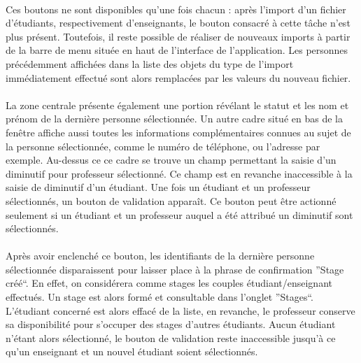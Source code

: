 \documentclass[a4paper,10pt]{report}
\begin{document}
	    \paragraph{}  
	      Ces boutons ne sont disponibles qu'une fois chacun : après l'import d'un fichier d'étudiants, respectivement d'enseignants, le bouton consacré à cette tâche n'est plus présent.
	      Toutefois, il reste possible de réaliser de nouveaux imports à partir de la barre de menu située en haut de l'interface de l'application.
	      Les personnes précédemment affichées dans la liste des objets du type de l'import immédiatement effectué sont alors remplacées par les valeurs du nouveau fichier.  
	      
	    \paragraph{}      
	      La zone centrale présente également une portion révélant le statut et les nom et prénom de la dernière personne sélectionnée.
	      Un autre cadre situé en bas de la fenêtre affiche aussi toutes les informations complémentaires connues au sujet de la personne sélectionnée, comme le numéro de téléphone, ou l'adresse par exemple.
	      Au-dessus ce ce cadre se trouve un champ permettant la saisie d'un diminutif pour professeur sélectionné.
	      Ce champ est en revanche inaccessible à la saisie de diminutif d'un étudiant.      
	      Une fois un étudiant et un professeur sélectionnés, un bouton de validation apparaît.
	      Ce bouton peut être actionné seulement si un étudiant et un professeur auquel a été attribué un diminutif sont sélectionnés.
	    
	    \paragraph{}
	      Après avoir enclenché ce bouton, les identifiants de la dernière personne sélectionnée disparaissent pour laisser place à la phrase de confirmation ''Stage créé``.
	      En effet, on considérera comme stages les couples étudiant/enseignant effectués.
	      Un stage est alors formé et consultable dans l'onglet ''Stages``. 
	      L'étudiant concerné est alors effacé de la liste, en revanche, le professeur conserve sa disponibilité pour s'occuper des stages d'autres étudiants.
	      Aucun étudiant n'étant alors sélectionné, le bouton de validation reste inaccessible jusqu'à ce qu'un enseignant et un nouvel étudiant soient sélectionnés.
	      
\end{document}
